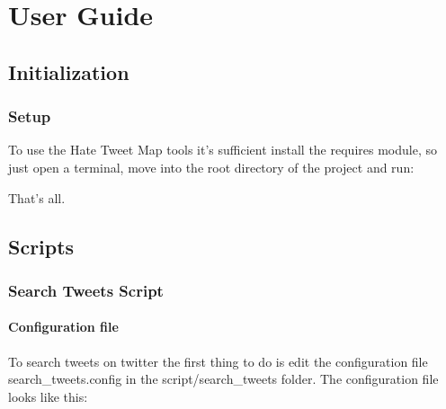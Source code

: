 \documentclass[letterpaper,10pt,english]{sphinxmanual}
\begin{document}
\chapter{User Guide}
\label{\detokenize{guide/guide:user-guide}}\label{\detokenize{guide/guide::doc}}

\section{Initialization}
\label{\detokenize{guide/setup:initialization}}\label{\detokenize{guide/setup::doc}}

\subsection{Setup}
\label{\detokenize{guide/setup:setup}}
\sphinxAtStartPar
To use the Hate Tweet Map tools it’s sufficient install the requires module,
so just open a terminal, move into the root directory of the project and run:

\begin{sphinxVerbatim}[commandchars=\\\{\}]
  
  
\end{sphinxVerbatim}

\sphinxAtStartPar
That’s all.


\section{Scripts}
\label{\detokenize{guide/script:scripts}}\label{\detokenize{guide/script::doc}}

\subsection{Search Tweets Script}
\label{\detokenize{guide/tweet_search_guide:search-tweets-script}}\label{\detokenize{guide/tweet_search_guide::doc}}

\subsubsection{Configuration file}
\label{\detokenize{guide/tweet_search_guide:configuration-file}}
\sphinxAtStartPar
To search tweets on twitter the first thing to do is edit
the configuration file search\_tweets.config in the script/search\_tweets folder.
The configuration file looks like this:
\end{document}
